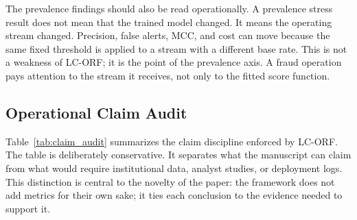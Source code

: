 \documentclass{ieeeaccess}
\begin{document}
The prevalence findings should also be read operationally. A prevalence stress result does not mean that the trained model changed. It means the operating stream changed. Precision, false alerts, MCC, and cost can move because the same fixed threshold is applied to a stream with a different base rate. This is not a weakness of LC-ORF; it is the point of the prevalence axis. A fraud operation pays attention to the stream it receives, not only to the fitted score function.

\subsection{Operational Claim Audit}
Table~\ref{tab:claim_audit} summarizes the claim discipline enforced by LC-ORF. The table is deliberately conservative. It separates what the manuscript can claim from what would require institutional data, analyst studies, or deployment logs. This distinction is central to the novelty of the paper: the framework does not add metrics for their own sake; it ties each conclusion to the evidence needed to support it.
\end{document}
